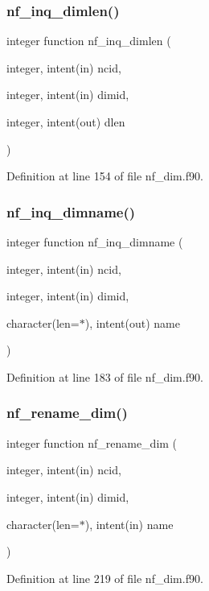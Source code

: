 \subsubsection{\texorpdfstring{nf\+\_\+inq\+\_\+dimlen()}{nf\_inq\_dimlen()}}
{\footnotesize\ttfamily integer function nf\+\_\+inq\+\_\+dimlen (\begin{DoxyParamCaption}\item[{integer, intent(in)}]{ncid,  }\item[{integer, intent(in)}]{dimid,  }\item[{integer, intent(out)}]{dlen }\end{DoxyParamCaption})}



Definition at line 154 of file nf\+\_\+dim.\+f90.

\mbox{\label{nf__dim_8f90_a6904228d7ca66bd37d8f8728881ee73c}} 
\subsubsection{\texorpdfstring{nf\+\_\+inq\+\_\+dimname()}{nf\_inq\_dimname()}}
{\footnotesize\ttfamily integer function nf\+\_\+inq\+\_\+dimname (\begin{DoxyParamCaption}\item[{integer, intent(in)}]{ncid,  }\item[{integer, intent(in)}]{dimid,  }\item[{character(len=$\ast$), intent(out)}]{name }\end{DoxyParamCaption})}



Definition at line 183 of file nf\+\_\+dim.\+f90.

\mbox{\label{nf__dim_8f90_a4aeb7c8253e9a2d1e5ea12fbf700c5f4}} 
\subsubsection{\texorpdfstring{nf\+\_\+rename\+\_\+dim()}{nf\_rename\_dim()}}
{\footnotesize\ttfamily integer function nf\+\_\+rename\+\_\+dim (\begin{DoxyParamCaption}\item[{integer, intent(in)}]{ncid,  }\item[{integer, intent(in)}]{dimid,  }\item[{character(len=$\ast$), intent(in)}]{name }\end{DoxyParamCaption})}



Definition at line 219 of file nf\+\_\+dim.\+f90.

